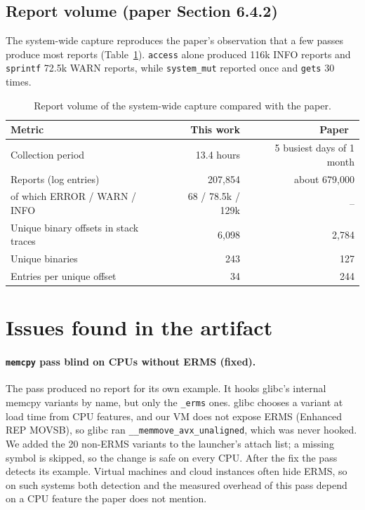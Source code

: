 \documentclass[11pt,a4paper]{article}
\newcommand{\pass}[1]{\texttt{#1}}
\begin{document}
\subsection{Report volume (paper Section 6.4.2)}
\label{sec:volume}

The system-wide capture reproduces the paper's observation that a few passes produce most reports
(Table~\ref{tab:volume}). \pass{access} alone produced 116k INFO reports and \pass{sprintf} 72.5k
WARN reports, while \pass{system\_mut} reported once and \pass{gets} 30 times.

\begin{table}[H]
\centering\small
\caption{Report volume of the system-wide capture compared with the paper.}
\label{tab:volume}
\begin{tabular}{@{}l r r@{}}
\toprule
Metric & This work & Paper~\cite{ossan} \\
\midrule
Collection period & 13.4 hours & 5 busiest days of 1 month \\
Reports (log entries) & 207{,}854 & about 679{,}000 \\
\quad of which ERROR / WARN / INFO & 68 / 78.5k / 129k & -- \\
Unique binary offsets in stack traces & 6{,}098 & 2{,}784 \\
Unique binaries & 243 & 127 \\
Entries per unique offset & 34 & 244 \\
\bottomrule
\end{tabular}
\end{table}

\section{Issues found in the artifact}
\label{sec:bugs}

\paragraph{\pass{memcpy} pass blind on CPUs without ERMS (fixed).}
The pass produced no report for its own example. It hooks glibc's internal memcpy variants by name,
but only the \texttt{\_erms} ones. glibc chooses a variant at load time from CPU features, and our
VM does not expose ERMS (Enhanced REP MOVSB), so glibc ran \texttt{\_\_memmove\_avx\_unaligned},
which was never hooked. We added the 20 non-ERMS variants to the launcher's attach list; a missing
symbol is skipped, so the change is safe on every CPU. After the fix the pass detects its example.
Virtual machines and cloud instances often hide ERMS, so on such systems both detection and the
measured overhead of this pass depend on a CPU feature the paper does not mention.
\end{document}
